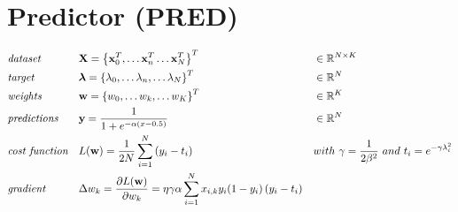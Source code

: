\documentclass[a4paper]{article}
\begin{document}
\pagebreak
\section*{Predictor (PRED)}
\begin{align}
	& \emph{dataset} &&
    \mathbf{X} = \left\{\mathbf{x}^T_0, 
    \dots\mathbf{x}^T_n \dots\mathbf{x}^T_N\right\}^T &&
    \in \mathbb{R}^{N\times K} \nonumber\\
    & \emph{target} && 
    \boldsymbol{\lambda} = \left\{\lambda_0, \dots\lambda_n, \dots 
    \lambda_N\right\}^T&&\in\mathbb{R}^N \nonumber \\
    & \emph{weights} && 
    \mathbf{w} = \left\{w_0, \dots w_k, \dots w_K\right\}^T && 
    \in \mathbb{R}^K\nonumber\\
	& \emph{predictions} && 
    \mathbf{y} = \frac{1}{1 + e^{-\alpha(x-0.5)}} &&
    \in \mathbb{R}^{N} \nonumber\\
    & \emph{cost function} && 
    L(\mathbf{w}) = \frac{1}{2N}\sum_{i=1}^N 
    {\left(y_i - t_i\right)} && 
    with\ \gamma = \frac{1}{2\beta^2}\ and\ t_i = 
    e^{-\gamma\lambda_i^2}\nonumber\\
    & \emph{gradient} && 
    \Delta w_k = \frac{\partial{L(\mathbf{w})}}
    {\partial{w_k}} = \eta\gamma\alpha
    \sum_{i=1}^N x_{i, k} y_i(1-y_i)
    \left(y_i - t_i\right) \nonumber
\end{align}
\end{document}
